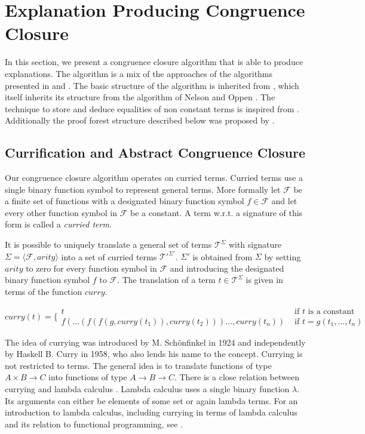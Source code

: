 \section{Explanation Producing Congruence Closure}
\label{sec:algorithm}

In this section, we present a congruence closure algorithm that is able to produce explanations.
The algorithm is a mix of the approaches of the algorithms presented in \cite{Fontaine2004} and \cite{Nieuwenhuis2005,Nieuwenhuis2007}.
The basic structure of the algorithm is inherited from \cite{Fontaine2004}, which itself inherits its structure from the algorithm of Nelson and Oppen \cite{Nelson1980}.
The technique to store and deduce equalities of non constant terms is inspired from \cite{Nieuwenhuis2005,Nieuwenhuis2007}.
Additionally the proof forest structure described below was proposed by \cite{Nieuwenhuis2005,Nieuwenhuis2007}.

\subsection*{Currification and Abstract Congruence Closure}
\label{subsec:algorithms_preliminaries}

Our congruence closure algorithm operates on curried terms.
Curried terms use a single binary function symbol to represent general terms.
More formally let $\mathcal{F}$ be a finite set of functions with a designated binary function symbol $f \in \mathcal{F}$ and let every other function symbol in $\mathcal{F}$ be a constant.
A term w.r.t. a signature of this form is called a \emph{curried term}.

It is possible to uniquely translate a general set of terms $\mathcal{T}^{\Sigma}$ with signature $\Sigma = \langle \mathcal{F},arity \rangle$ into a set of curried terms $\mathcal{T'}^{\Sigma'}$.
$\Sigma'$ is obtained from $\Sigma$ by setting $arity$ to zero for every function symbol in $\mathcal{F}$ and introducing the designated binary function symbol $f$ to $\mathcal{F}$.
The translation of a term $t \in \mathcal{T}^{\Sigma}$ is given in terms of the function $curry$.

$$
curry(t) = \Big\{
\begin{array}{ll}
	t & \text{ if } t \text{ is a constant }\\
	f(\ldots (f(f(g,curry(t_1)),curry(t_2)))\ldots,curry(t_n)) &\text{ if } t = g(t_1,\ldots, t_n)
\end{array}
$$

The idea of currying was introduced by M. Sch\"onfinkel \cite{Schoenfinkel1924} in 1924 and independently by Haskell B. Curry \cite{Curry1958} in 1958, who also lends his name to the concept.
Currying is not restricted to terms.
The general idea is to translate functions of type $A \times B \rightarrow C$ into functions of type $A \rightarrow B \rightarrow C$.
There is a close relation between currying and lambda calculus \cite{Church1936}.
Lambda calculus uses a single binary function $\lambda$.
Its arguments can either be elements of some set or again lambda terms.
For an introduction to lambda calculus, including currying in terms of lambda calculus and its relation to functional programming, see \cite{Barendregt1997}.

